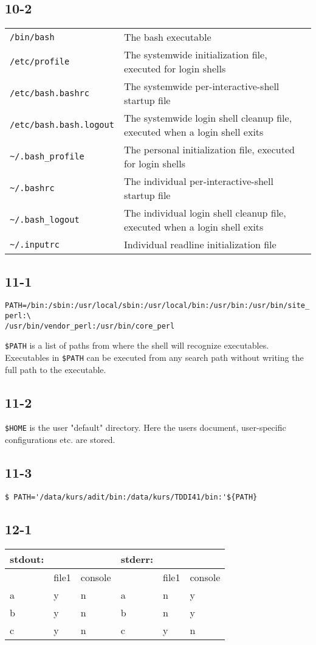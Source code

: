\subsection{10-2}
\begin{tabular}{ll}
\verb=/bin/bash= &
	The bash executable\\
\verb=/etc/profile= &
	The systemwide initialization file, executed for login shells\\
\verb=/etc/bash.bashrc= &
	The systemwide per-interactive-shell startup file\\
\verb=/etc/bash.bash.logout= &
	The systemwide login shell cleanup file, executed when a login shell exits\\
\verb=~/.bash_profile= &
	The personal initialization file, executed for login shells\\
\verb=~/.bashrc= &
	The individual per-interactive-shell startup file\\
\verb=~/.bash_logout= &
	The individual login shell cleanup file, executed when a login shell exits\\
\verb=~/.inputrc=&
	Individual readline initialization file
\end{tabular}
\subsection{11-1}
\verb+PATH=/bin:/sbin:/usr/local/sbin:/usr/local/bin:/usr/bin:/usr/bin/site_perl:\+\\
\verb+/usr/bin/vendor_perl:/usr/bin/core_perl+

\verb=$PATH= is a list of paths from where the shell will recognize executables. Executables in \verb=$PATH= can be executed from any search path without writing the full path to the executable.

\subsection{11-2}
\verb=$HOME= is the user "default" directory. Here the users document, user-specific configurations etc. are stored.

\subsection{11-3}
\begin{verbatim}$ PATH='/data/kurs/adit/bin:/data/kurs/TDDI41/bin:'${PATH}\end{verbatim}

\subsection{12-1}
\begin{tabular}{l|ll||l|ll}
stdout: &&&	stderr:&&\\\hline
 &  file1 &console&	  & file1& console\\\hline
a&  y&	 n &	  a&  n&     y\\
b&  y&   n &		b&  n&     y\\
c&  y&	 n &		c&  y&	   n
\end{tabular}
